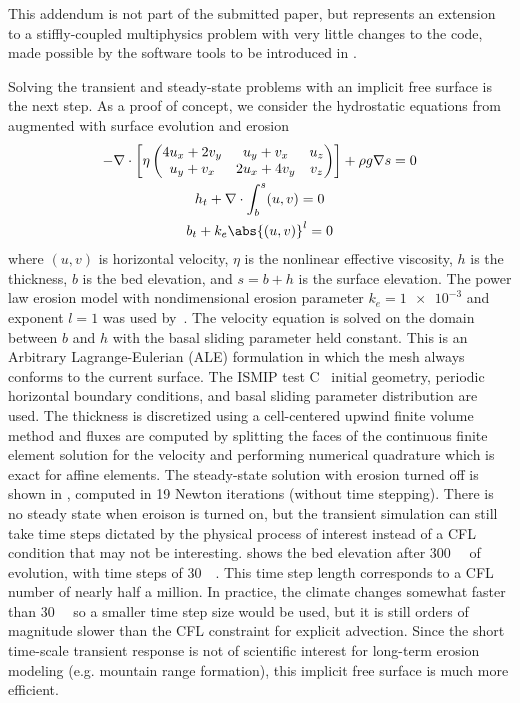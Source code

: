 \textsf{This addendum is not part of the submitted paper, but represents an extension to a stiffly-coupled multiphysics problem with very little changes to the code, made possible by the software tools to be introduced in .}
\vspace{0.5cm}

Solving the transient and steady-state problems with an implicit free surface is the next step.
As a proof of concept, we consider the hydrostatic equations from  augmented with surface evolution and erosion
\begin{gather}
  - \nabla\cdot \left[ \eta
    \begin{pmatrix}
      4 u_x + 2 v_y & u_y + v_x & u_z \\
      u_y + v_x & 2 u_x + 4 v_y & v_z
    \end{pmatrix} \right] + \rho g \nabla s = 0 \\
  h_t + \nabla\cdot \int_b^{s} (u,v) = 0  \\
  b_t + k_e \abs{(u,v)}^l = 0
\end{gather}
where $(u,v)$ is horizontal velocity, $\eta$ is the nonlinear effective viscosity, $h$ is the thickness, $b$ is the bed elevation, and $s = b+h$ is the surface elevation.
The power law erosion model with nondimensional erosion parameter $k_e = \num{1e-3}$ and exponent $l=1$ was used by~\citet{tomkin2002influence,herman2008evolution,egholm2011modeling}.
The velocity equation is solved on the domain between $b$ and $h$ with the basal sliding parameter held constant.
This is an Arbitrary Lagrange-Eulerian (ALE) formulation \citep{donea2004arbitrary} in which the mesh always conforms to the current surface.
The ISMIP test C~\citep{pattyn2008beh} initial geometry, periodic horizontal boundary conditions, and basal sliding parameter distribution are used.
The thickness is discretized using a cell-centered upwind finite volume method and fluxes are computed by splitting the faces of the continuous finite element solution for the velocity and performing numerical quadrature which is exact for affine elements.
The steady-state solution with erosion turned off is shown in , computed in 19 Newton iterations (without time stepping).
There is no steady state when eroison is turned on, but the transient simulation can still take time steps dictated by the physical process of interest instead of a CFL condition that may not be interesting.
 shows the bed elevation after \SI{300}{\kilo\year} of evolution, with time steps of \SI{30}{\kilo\year}.
This time step length corresponds to a CFL number of nearly half a million.
In practice, the climate changes somewhat faster than \SI{30}{\kilo\year} so a smaller time step size would be used, but it is still orders of magnitude slower than the CFL constraint for explicit advection.
Since the short time-scale transient response is not of scientific interest for long-term erosion modeling (e.g. mountain range formation), this implicit free surface is much more efficient.

